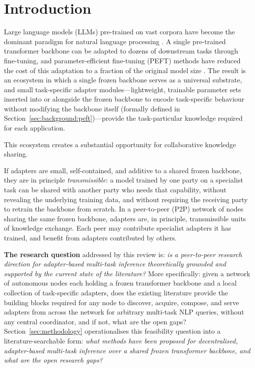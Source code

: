 \section{Introduction}
\label{sec:introduction}

Large language models (LLMs) pre-trained on vast corpora have become the dominant
paradigm for natural language processing \cite{Vaswani2017, Devlin2019}. A single
pre-trained transformer backbone can be adapted to dozens of downstream tasks through
fine-tuning, and parameter-efficient fine-tuning (PEFT) methods have reduced the cost
of this adaptation to a fraction of the original model size \cite{Houlsby2019, Hu2022}.
The result is an ecosystem in which a single frozen backbone serves as a universal
substrate, and small task-specific adapter modules---lightweight,
trainable parameter sets inserted into or alongside the frozen backbone to
encode task-specific behaviour without modifying the backbone itself
(formally defined in Section~\ref{sec:background:peft})---provide the
task-particular knowledge required for each application.

This ecosystem creates a substantial opportunity for collaborative knowledge sharing.

If adapters are small, self-contained, and additive to a shared frozen backbone, they
are in principle \textit{transmissible}: a model trained by one party on a specialist
task can be shared with another party who needs that capability, without revealing
the underlying training data, and without requiring the receiving party to retrain the
backbone from scratch. In a peer-to-peer (P2P) network of nodes sharing the same
frozen backbone, adapters are, in principle, transmissible units of knowledge exchange. Each peer
may contribute specialist adapters it has trained, and benefit from adapters
contributed by others.

\textbf{The research question} addressed by this review is: \textit{is a
peer-to-peer research direction for adapter-based multi-task inference
theoretically grounded and supported by the current state of the literature?}
More specifically: given a network of autonomous nodes each holding a frozen
transformer backbone and a local collection of task-specific adapters, does the
existing literature provide the building blocks required for any node to
discover, acquire, compose, and serve adapters from across the network for
arbitrary multi-task NLP queries, without any central coordinator, and if
not, what are the open gaps?
Section~\ref{sec:methodology} operationalises this feasibility question into a literature-searchable form: \textit{what methods have been proposed
for decentralised, adapter-based multi-task inference over a shared frozen
transformer backbone, and what are the open research gaps?}

